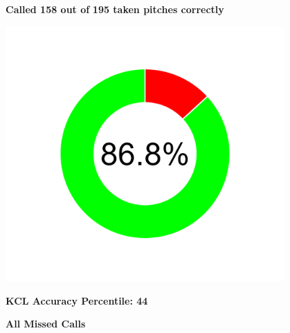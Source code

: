 \documentclass[
]{article}
\begin{document}
\begin{center}
\begin{minipage}[t][3.5in][t]{\textwidth}
\begin{minipage}[t]{0.25\textwidth}
\centering
\vspace*{-5em}
\textbf{Called 158 out of}
\textbf{195 taken pitches correctly}
\end{minipage}
\hfill
\begin{minipage}[t]{0.28\textwidth}
\centering
\includegraphics[width=0.8\textwidth]{plots/overall_accuracy.png}
\end{minipage}
\hfill
\begin{minipage}[t]{0.25\textwidth}
\centering
\vspace*{-4em}
\textbf{KCL Accuracy Percentile: 44}
\end{minipage}
\end{minipage}
\end{center}

\vspace*{-15em}

\begin{center}
\Large \textbf{All Missed Calls}
\end{center}
\end{document}
